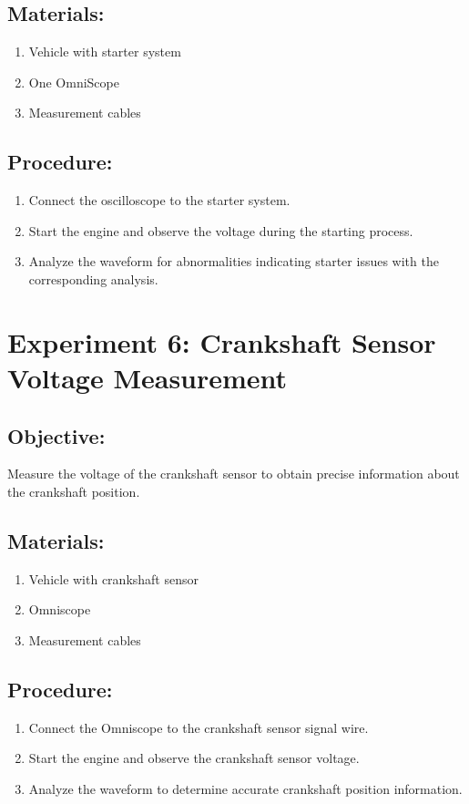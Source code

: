 \documentclass{scrreprt}
\begin{document}
\subsection*{Materials:}
\begin{enumerate}
    \item Vehicle with starter system
    \item One OmniScope
    \item Measurement cables
\end{enumerate}
\subsection*{Procedure:}
\begin{enumerate}
    \item Connect the oscilloscope to the starter system.
    \item Start the engine and observe the voltage during the starting process.
    \item Analyze the waveform for abnormalities indicating starter issues with the corresponding analysis.
\end{enumerate}

\section*{Experiment 6: Crankshaft Sensor Voltage Measurement}
\subsection*{Objective:} Measure the voltage of the crankshaft sensor to obtain precise information about the crankshaft position.
\subsection*{Materials:}
\begin{enumerate}
    \item Vehicle with crankshaft sensor
    \item Omniscope
    \item Measurement cables
\end{enumerate}
\subsection*{Procedure:}
\begin{enumerate}
    \item Connect the Omniscope to the crankshaft sensor signal wire.
    \item Start the engine and observe the crankshaft sensor voltage.
    \item Analyze the waveform to determine accurate crankshaft position information.
\end{enumerate}
\end{document}

